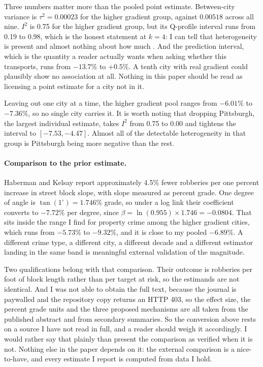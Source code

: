 \documentclass[12pt,letterpaper]{article}
\begin{document}
Three numbers matter more than the pooled point estimate. Between-city variance is
$\tau^2 = 0.00023$ for the higher gradient group, against $0.00518$ across all nine.
$I^2$ is 0.75 for the higher gradient group, but its Q-profile interval
\citep{viechtbauer2007} runs from 0.19 to 0.98, which is the honest statement at
$k=4$: I can tell that heterogeneity is present and almost nothing about how much
\citep{higgins2002}. And the prediction interval, which is the quantity a reader
actually wants when asking whether this transports, runs from $-13.7\%$ to
$+0.5\%$. A tenth city with real gradient could plausibly show no association at
all. Nothing in this paper should be read as licensing a point estimate for a city
not in it.

Leaving out one city at a time, the higher gradient pool ranges from $-6.01\%$ to
$-7.36\%$, so no single city carries it. It is worth noting that dropping
Pittsburgh, the largest individual estimate, takes $I^2$ from 0.75 to 0.00 and
tightens the interval to $[-7.53, -4.47]$. Almost all of the detectable
heterogeneity in that group is Pittsburgh being more negative than the rest.

\paragraph{Comparison to the prior estimate.} Haberman and Kelsay report approximately
4.5\% fewer robberies per one percent increase in street block slope, with slope
measured as percent grade. One degree of angle is $\tan(1^\circ) = 1.746\%$ grade, so
under a log link their coefficient converts to $-7.72\%$ per degree, since
$\beta = \ln(0.955) \times 1.746 = -0.0804$. That sits inside the range I find for
property crime among the higher gradient cities, which runs from $-5.73\%$ to
$-9.32\%$, and it is close to my pooled $-6.89\%$. A different crime type, a different
city, a different decade and a different estimator landing in the same band is
meaningful external validation of the magnitude.

Two qualifications belong with that comparison. Their outcome is robberies per foot of
block length rather than per target at risk, so the estimands are not identical. And I
was not able to obtain the full text, because the journal is paywalled and the
repository copy returns an HTTP 403, so the effect size, the percent grade units and
the three proposed mechanisms are all taken from the published abstract and from
secondary summaries. So the conversion above rests on a source I have not read in
full, and a reader should weigh it accordingly. I would rather say that plainly than
present the comparison as verified when it is not. Nothing else in the paper depends
on it: the external comparison is a nice-to-have, and every estimate I report is
computed from data I hold.
\end{document}
